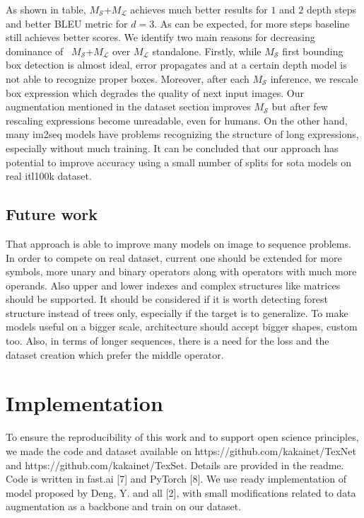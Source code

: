 \documentclass{sciposter}
\begin{document}
\begin{multicols}{3}
\begin{table}[ht]
\begin{tabular}{c| rr  }
\hline\hline  
\end{tabular} 
\label{tab:hresult} 
\end{table} 

As shown in table, $M_{\mathcal{S}}$+$M_{\mathcal{L}}$ achieves much better results for $1$ and $2$ depth steps and better BLEU metric for $d=3$. As can be expected, for more steps baseline still achieves better scores. We identify two main reasons for decreasing dominance of  $M_{\mathcal{S}}$+$M_{\mathcal{L}}$ over $M_{\mathcal{L}}$ standalone. Firstly, while $M_{\mathcal{S}}$ first bounding box detection is almost ideal, error propagates and at a certain depth model is not able to recognize proper boxes. Moreover, after each $M_{\mathcal{S}}$ inference, we rescale box expression which degrades the quality of next input images. Our augmentation mentioned in the dataset section improves $M_{\mathcal{S}}$ but after few rescaling expressions become unreadable, even for humans. On the other hand, many im2seq models have problems recognizing the structure of long expressions, especially without much training. It can be concluded that our approach has potential to improve accuracy using a small number of splits for sota models on real itl100k dataset.


\subsection{Future work}
That approach is able to improve many models on image to sequence problems. In order to compete on real dataset, current one should be extended for more symbols, more unary and binary operators along with operators with much more operands. Also upper and lower indexes and complex structures like matrices should be supported. It should be considered if it is worth detecting forest structure instead of trees only, especially if the target is to generalize. To make models useful on a bigger scale, architecture should accept bigger shapes, custom too. Also, in terms of longer sequences, there is a need for the loss and the dataset creation which prefer the middle operator.

\section{Implementation}

To ensure the reproducibility of this work and to support open science principles, we made the code and dataset available on https://github.com/kakainet/TexNet and https://github.com/kakainet/TexSet. Details are provided in the readme. Code is written in fast.ai [7] and PyTorch [8]. We use ready implementation of model proposed by Deng, Y. and all [2], with small modifications related to data augmentation as a backbone and train on our dataset.
 

\end{multicols}
\end{document}
